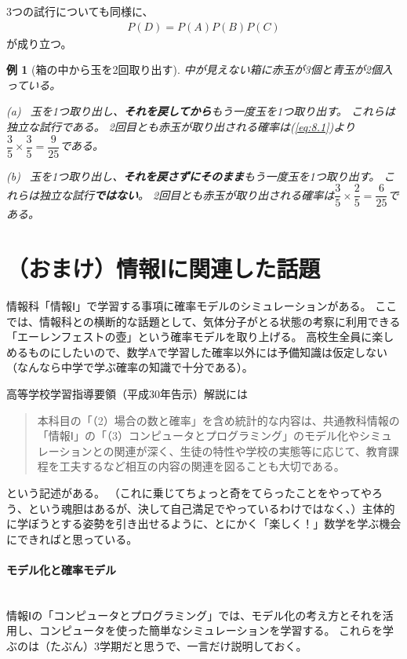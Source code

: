 \documentclass[luatexja,fontsize=12pt]{jlreq}\usepackage{ifthen}\newcounter{enlarge}\setcounter{enlarge}{1}
\newtheorem{eg}{例}
\begin{document}
3つの試行についても同様に、
\begin{align} \label{eq:8.2}
P(D) = P(A) P(B) P(C)
\end{align}
が成り立つ。

\begin{eg}[箱の中から玉を2回取り出す]
中が見えない箱に赤玉が3個と青玉が2個入っている。

(a)~
玉を1つ取り出し、\textbf{それを戻してから}もう一度玉を1つ取り出す。
これらは独立な試行である。
2回目とも赤玉が取り出される確率は(\ref{eq:8.1})より$\dfrac{3}{5} \times \dfrac{3}{5} = \dfrac{9}{25}$である。

(b)~
玉を1つ取り出し、\textbf{それを戻さずにそのまま}もう一度玉を1つ取り出す。
これらは独立な試行\textbf{ではない}。
2回目とも赤玉が取り出される確率は$\dfrac{3}{5} \times \dfrac{2}{5} = \dfrac{6}{25}$である。
\end{eg}

\section*{（おまけ）情報Ⅰに関連した話題}

情報科「情報Ⅰ」で学習する事項に確率モデルのシミュレーションがある。
ここでは、情報科との横断的な話題として、気体分子がとる状態の考察に利用できる「エーレンフェストの壺」という確率モデルを取り上げる。
高校生全員に楽しめるものにしたいので、数学Aで学習した確率以外には予備知識は仮定しない（なんなら中学で学ぶ確率の知識で十分である）。

高等学校学習指導要領（平成30年告示）解説には
\begin{quotation}
本科目の「（2）場合の数と確率」を含め統計的な内容は、共通教科情報の「情報Ⅰ」の「（3）コンピュータとプログラミング」のモデル化やシミュレーションとの関連が深く、生徒の特性や学校の実態等に応じて、教育課程を工夫するなど相互の内容の関連を図ることも大切である。
\end{quotation}
という記述がある。
（これに乗じてちょっと奇をてらったことをやってやろう、という魂胆はあるが、決して自己満足でやっているわけではなく、）主体的に学ぼうとする姿勢を引き出せるように、とにかく「楽しく！」数学を学ぶ機会にできればと思っている。
\mbox{}\\

\paragraph{モデル化と確率モデル}\mbox{}\\
\indent
情報Ⅰの「コンピュータとプログラミング」では、モデル化の考え方とそれを活用し、コンピュータを使った簡単なシミュレーションを学習する。
これらを学ぶのは（たぶん）3学期だと思うで、一言だけ説明しておく。
\end{document}
